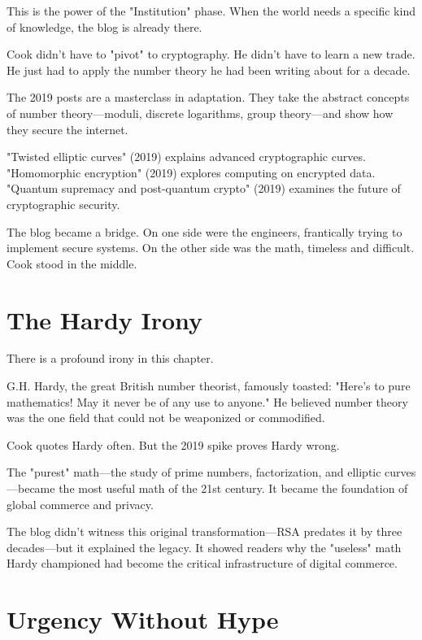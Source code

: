 This is the power of the "Institution" phase. When the world needs a specific kind of knowledge, the blog is already there.

Cook didn't have to "pivot" to cryptography. He didn't have to learn a new trade. He just had to apply the number theory he had been writing about for a decade.

The 2019 posts are a masterclass in adaptation. They take the abstract concepts of number theory---moduli, discrete logarithms, group theory---and show how they secure the internet.

"Twisted elliptic curves" (2019) explains advanced cryptographic curves.
"Homomorphic encryption" (2019) explores computing on encrypted data.
"Quantum supremacy and post-quantum crypto" (2019) examines the future of cryptographic security.

The blog became a bridge. On one side were the engineers, frantically trying to implement secure systems. On the other side was the math, timeless and difficult. Cook stood in the middle.

\bigskip

\section*{The Hardy Irony}

There is a profound irony in this chapter.

G.H. Hardy, the great British number theorist, famously toasted: "Here's to pure mathematics! May it never be of any use to anyone." He believed number theory was the one field that could not be weaponized or commodified.

Cook quotes Hardy often. But the 2019 spike proves Hardy wrong.

The "purest" math---the study of prime numbers, factorization, and elliptic curves---became the most useful math of the 21st century. It became the foundation of global commerce and privacy.

The blog didn't witness this original transformation---RSA predates it by three decades---but it explained the legacy. It showed readers why the "useless" math Hardy championed had become the critical infrastructure of digital commerce.

\bigskip

\section*{Urgency Without Hype}

